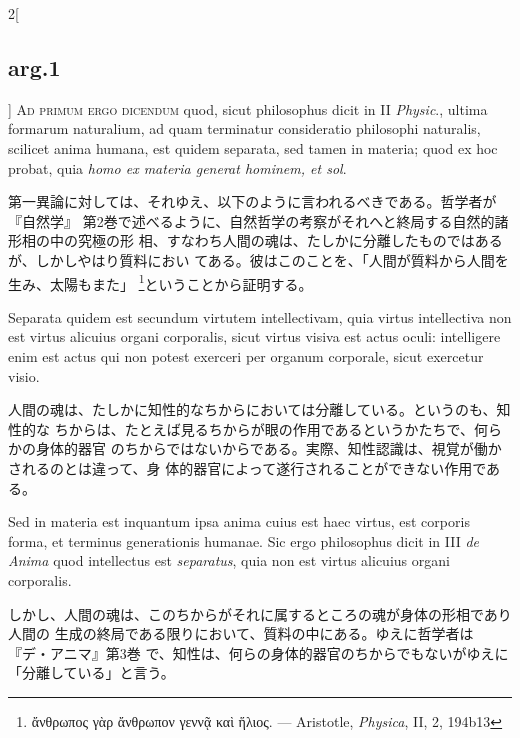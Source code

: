 \documentclass[paper=a4paper,fontsize=10pt,jafontsize=9pt,titlepage]{jlreq}
\begin{document}
\begin{paracol}{2}[\subsection{arg.1}]
 {\scshape Ad primum ergo dicendum} quod, sicut philosophus dicit in
 II {\itshape Physic}., ultima formarum naturalium, ad quam terminatur
 consideratio philosophi naturalis, scilicet anima humana, est quidem
 separata, sed tamen in materia; quod ex hoc probat, quia {\itshape
 homo ex materia generat hominem, et sol}.

 \switchcolumn

 第一異論に対しては、それゆえ、以下のように言われるべきである。哲学者が『自然学』
 第2巻で述べるように、自然哲学の考察がそれへと終局する自然的諸形相の中の究極の形
 相、すなわち人間の魂は、たしかに分離したものではあるが、しかしやはり質料におい
 てある。彼はこのことを、「人間が質料から人間を生み、太陽もまた」
 \footnote{\foreignlanguage{greek}{ἄνθρωπος γὰρ ἄνθρωπον γεννᾷ καὶ ἥλιος.}  ---
 Aristotle, \textit{Physica}, II, 2, 194b13 }ということから証明する。

 \switchcolumn


 Separata quidem est secundum virtutem intellectivam, quia virtus intellectiva
 non est virtus alicuius organi corporalis, sicut virtus visiva est actus oculi:
 intelligere enim est actus qui non potest exerceri per organum corporale, sicut
 exercetur visio.

 \switchcolumn

 人間の魂は、たしかに知性的なちからにおいては分離している。というのも、知性的な
 ちからは、たとえば見るちからが眼の作用であるというかたちで、何らかの身体的器官
 のちからではないからである。実際、知性認識は、視覚が働かされるのとは違って、身
 体的器官によって遂行されることができない作用である。

 \switchcolumn

 Sed in materia est inquantum ipsa anima cuius est haec virtus, est corporis
 forma, et terminus generationis humanae. Sic ergo philosophus dicit in III
 {\itshape de Anima} quod intellectus est {\itshape separatus}, quia non est
 virtus alicuius organi corporalis.
 
\switchcolumn

 しかし、人間の魂は、このちからがそれに属するところの魂が身体の形相であり人間の
 生成の終局である限りにおいて、質料の中にある。ゆえに哲学者は『デ・アニマ』第3巻
 で、知性は、何らの身体的器官のちからでもないがゆえに「分離している」と言う。
  
\switchcolumn*[\subsection{ad 2, 3}]


\end{paracol}
\end{document}
